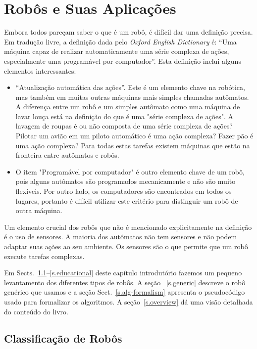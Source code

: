 
\chapter{Robôs e Suas Aplicações}\label{ch.basic}

Embora todos pareçam saber o que é um robô, é difícil dar uma definição precisa. Em tradução livre, a definição dada pelo \emph{Oxford English Dictionary} é: ``Uma máquina capaz de realizar automaticamente uma série complexa de ações, especialmente uma programável por computador''. Esta definição inclui alguns elementos interessantes:
\begin{itemize}
\item ``Atualização automática das ações''. Este é um elemento chave na robótica, mas também em muitas outras máquinas mais simples chamadas autômatos. A diferença entre um robô e um simples autômato como uma máquina de lavar louça está na definição do que é uma "série complexa de ações". A lavagem de roupas é ou não composta de uma série complexa de ações? Pilotar um avião em um piloto automático é uma ação complexa? Fazer pão é uma ação complexa? Para todas estas tarefas existem máquinas que estão na fronteira entre autômatos e robôs.
\item O item "Programável por computador" é outro elemento chave de um robô, pois alguns autômatos são programados mecanicamente e não são muito flexíveis. Por outro lado, os computadores são encontrados em todos os lugares, portanto é difícil utilizar este critério para distinguir um robô de outra máquina.
\end{itemize}
Um elemento crucial dos robôs que não é mencionado explicitamente na definição é o uso de sensores. A maioria dos autômatos não tem sensores e não podem adaptar suas ações ao seu ambiente. Os sensores são o que permite que um robô execute tarefas complexas. 

Em Sects.~\ref{s.classification}--\ref{s.educational} deste capítulo introdutório fazemos um pequeno levantamento dos diferentes tipos de robôs. A seção ~\ref{s.generic} descreve o robô genérico que usamos e a seção Sect.~\ref{s.alg-formalism} apresenta o pseudocódigo usado para formalizar os algoritmos. A seção~\ref{s.overview} dá uma visão detalhada do conteúdo do livro.

\section{Classificação de Robôs}\label{s.classification}

